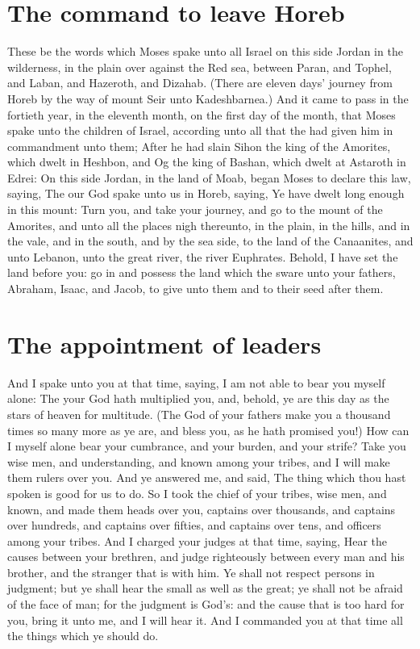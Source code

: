 
\section*{The command to leave Horeb}
\begin{biblechapter} %
\verse These be the words which Moses spake unto all Israel on this side Jordan in the wilderness, in the plain over against the Red sea, between Paran, and Tophel, and Laban, and Hazeroth, and Dizahab.
\verse (There are eleven days' journey from Horeb by the way of mount Seir unto Kadeshbarnea.)
\verse And it came to pass in the fortieth year, in the eleventh month, on the first day of the month, that Moses spake unto the children of Israel, according unto all that the \LORD had given him in commandment unto them;
\verse After he had slain Sihon the king of the Amorites, which dwelt in Heshbon, and Og the king of Bashan, which dwelt at Astaroth in Edrei:
\verse On this side Jordan, in the land of Moab, began Moses to declare this law, saying,
\verse The \LORD our God spake unto us in Horeb, saying, Ye have dwelt long enough in this mount:
\verse Turn you, and take your journey, and go to the mount of the Amorites, and unto all the places nigh thereunto, in the plain, in the hills, and in the vale, and in the south, and by the sea side, to the land of the Canaanites, and unto Lebanon, unto the great river, the river Euphrates.
\verse Behold, I have set the land before you: go in and possess the land which the \LORD sware unto your fathers, Abraham, Isaac, and Jacob, to give unto them and to their seed after them.
\section*{The appointment of leaders}
\verse And I spake unto you at that time, saying, I am not able to bear you myself alone:
\verse The \LORD your God hath multiplied you, and, behold, ye are this day as the stars of heaven for multitude.
\verse (The \LORD God of your fathers make you a thousand times so many more as ye are, and bless you, as he hath promised you!)
\verse How can I myself alone bear your cumbrance, and your burden, and your strife?
\verse Take you wise men, and understanding, and known among your tribes, and I will make them rulers over you.
\verse And ye answered me, and said, The thing which thou hast spoken is good for us to do.
\verse So I took the chief of your tribes, wise men, and known, and made them heads over you, captains over thousands, and captains over hundreds, and captains over fifties, and captains over tens, and officers among your tribes.
\verse And I charged your judges at that time, saying, Hear the causes between your brethren, and judge righteously between every man and his brother, and the stranger that is with him.
\verse Ye shall not respect persons in judgment; but ye shall hear the small as well as the great; ye shall not be afraid of the face of man; for the judgment is God's: and the cause that is too hard for you, bring it unto me, and I will hear it.
\verse And I commanded you at that time all the things which ye should do.

\end{biblechapter}
